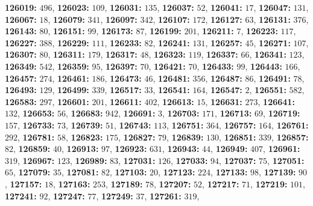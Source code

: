 \textsf{\bfseries 126019:} $496$, \textsf{\bfseries 126023:} $109$, \textsf{\bfseries 126031:} $135$, \textsf{\bfseries 126037:} $52$, \textsf{\bfseries 126041:} $17$, \textsf{\bfseries 126047:} $131$, \textsf{\bfseries 126067:} $18$, \textsf{\bfseries 126079:} $341$, \textsf{\bfseries 126097:} $342$, \textsf{\bfseries 126107:} $172$, \textsf{\bfseries 126127:} $63$, \textsf{\bfseries 126131:} $376$, \textsf{\bfseries 126143:} $80$, \textsf{\bfseries 126151:} $99$, \textsf{\bfseries 126173:} $87$, \textsf{\bfseries 126199:} $201$, \textsf{\bfseries 126211:} $7$, \textsf{\bfseries 126223:} $117$, \textsf{\bfseries 126227:} $388$, \textsf{\bfseries 126229:} $111$, \textsf{\bfseries 126233:} $82$, \textsf{\bfseries 126241:} $131$, \textsf{\bfseries 126257:} $45$, \textsf{\bfseries 126271:} $107$, \textsf{\bfseries 126307:} $80$, \textsf{\bfseries 126311:} $179$, \textsf{\bfseries 126317:} $48$, \textsf{\bfseries 126323:} $119$, \textsf{\bfseries 126337:} $66$, \textsf{\bfseries 126341:} $123$, \textsf{\bfseries 126349:} $542$, \textsf{\bfseries 126359:} $95$, \textsf{\bfseries 126397:} $70$, \textsf{\bfseries 126421:} $70$, \textsf{\bfseries 126433:} $99$, \textsf{\bfseries 126443:} $166$, \textsf{\bfseries 126457:} $274$, \textsf{\bfseries 126461:} $186$, \textsf{\bfseries 126473:} $46$, \textsf{\bfseries 126481:} $356$, \textsf{\bfseries 126487:} $86$, \textsf{\bfseries 126491:} $78$, \textsf{\bfseries 126493:} $129$, \textsf{\bfseries 126499:} $339$, \textsf{\bfseries 126517:} $33$, \textsf{\bfseries 126541:} $164$, \textsf{\bfseries 126547:} $2$, \textsf{\bfseries 126551:} $582$, \textsf{\bfseries 126583:} $297$, \textsf{\bfseries 126601:} $201$, \textsf{\bfseries 126611:} $402$, \textsf{\bfseries 126613:} $15$, \textsf{\bfseries 126631:} $273$, \textsf{\bfseries 126641:} $132$, \textsf{\bfseries 126653:} $56$, \textsf{\bfseries 126683:} $942$, \textsf{\bfseries 126691:} $3$, \textsf{\bfseries 126703:} $171$, \textsf{\bfseries 126713:} $69$, \textsf{\bfseries 126719:} $157$, \textsf{\bfseries 126733:} $73$, \textsf{\bfseries 126739:} $51$, \textsf{\bfseries 126743:} $113$, \textsf{\bfseries 126751:} $364$, \textsf{\bfseries 126757:} $164$, \textsf{\bfseries 126761:} $292$, \textsf{\bfseries 126781:} $58$, \textsf{\bfseries 126823:} $175$, \textsf{\bfseries 126827:} $79$, \textsf{\bfseries 126839:} $130$, \textsf{\bfseries 126851:} $339$, \textsf{\bfseries 126857:} $82$, \textsf{\bfseries 126859:} $40$, \textsf{\bfseries 126913:} $97$, \textsf{\bfseries 126923:} $631$, \textsf{\bfseries 126943:} $44$, \textsf{\bfseries 126949:} $407$, \textsf{\bfseries 126961:} $319$, \textsf{\bfseries 126967:} $123$, \textsf{\bfseries 126989:} $83$, \textsf{\bfseries 127031:} $126$, \textsf{\bfseries 127033:} $94$, \textsf{\bfseries 127037:} $75$, \textsf{\bfseries 127051:} $65$, \textsf{\bfseries 127079:} $35$, \textsf{\bfseries 127081:} $82$, \textsf{\bfseries 127103:} $20$, \textsf{\bfseries 127123:} $224$, \textsf{\bfseries 127133:} $98$, \textsf{\bfseries 127139:} $90$, \textsf{\bfseries 127157:} $18$, \textsf{\bfseries 127163:} $253$, \textsf{\bfseries 127189:} $78$, \textsf{\bfseries 127207:} $52$, \textsf{\bfseries 127217:} $71$, \textsf{\bfseries 127219:} $101$, \textsf{\bfseries 127241:} $92$, \textsf{\bfseries 127247:} $77$, \textsf{\bfseries 127249:} $37$, \textsf{\bfseries 127261:} $319$, 
